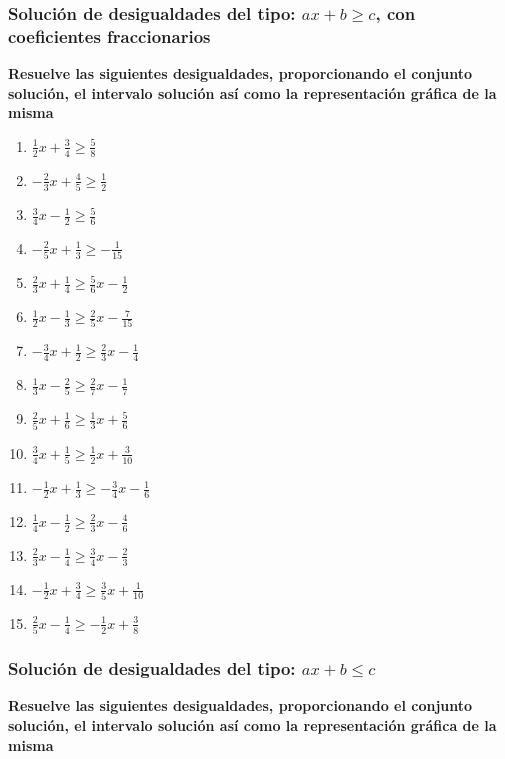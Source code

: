 \documentclass[12pt]{article}
\theoremstyle{plain}
\theoremstyle{definition}
\theoremstyle{remark}
\begin{document}
\subsubsection{Solución de desigualdades del tipo: \(ax+b \geq c\), con coeficientes fraccionarios}{
\textbf{Resuelve las siguientes desigualdades, proporcionando el conjunto solución, el intervalo solución así como la representación gráfica de la misma}

\begin{enumerate}
\def\labelenumi{\arabic{enumi}.}
\item
  \(\frac{1}{2}x + \frac{3}{4} \geq \frac{5}{8}\)
\item
  \(-\frac{2}{3}x + \frac{4}{5} \geq \frac{1}{2}\)
\item
  \(\frac{3}{4}x - \frac{1}{2} \geq \frac{5}{6}\)
\item
  \(-\frac{2}{5}x + \frac{1}{3} \geq -\frac{1}{15}\)
\item
  \(\frac{2}{3}x + \frac{1}{4} \geq \frac{5}{6}x - \frac{1}{2}\)
\item
  \(\frac{1}{2}x - \frac{1}{3} \geq \frac{2}{5}x - \frac{7}{15}\)
\item
  \(-\frac{3}{4}x + \frac{1}{2} \geq \frac{2}{3}x - \frac{1}{4}\)
\item
  \(\frac{1}{3}x - \frac{2}{5} \geq \frac{2}{7}x - \frac{1}{7}\)
\item
  \(\frac{2}{5}x + \frac{1}{6} \geq \frac{1}{3}x + \frac{5}{6}\)
\item
  \(\frac{3}{4}x + \frac{1}{5} \geq \frac{1}{2}x + \frac{3}{10}\)
\item
  \(-\frac{1}{2}x + \frac{1}{3} \geq -\frac{3}{4}x - \frac{1}{6}\)
\item
  \(\frac{1}{4}x - \frac{1}{2} \geq \frac{2}{3}x - \frac{4}{6}\)
\item
  \(\frac{2}{3}x - \frac{1}{4} \geq \frac{3}{4}x - \frac{2}{3}\)
\item
  \(-\frac{1}{2}x + \frac{3}{4} \geq \frac{3}{5}x + \frac{1}{10}\)
\item
  \(\frac{2}{5}x - \frac{1}{4} \geq -\frac{1}{2}x + \frac{3}{8}\)
\end{enumerate}

\subsubsection{Solución de desigualdades del tipo: \(ax+b \leq c\)}

\textbf{Resuelve las siguientes desigualdades, proporcionando el conjunto solución, el intervalo solución así como la representación gráfica de la misma}

}
\end{document}
